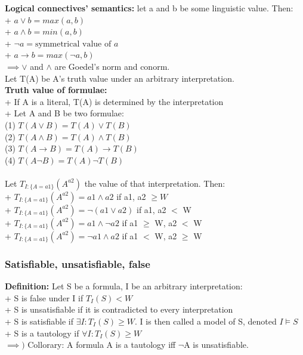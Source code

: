 \documentclass[26pt,fleqn,]{article}
\begin{document}
{\bfseries Logical connectives' semantics:} let a and b be some linguistic value. Then:\\
\indent + \(a \vee b = max(a,b)\)\\
\indent + \(a \wedge b = min(a,b)\)\\
\indent + \(\neg a = \text{symmetrical value of } a\)\\
\indent + \(a \to b = max(\neg a,b)\)\\
\(\implies \vee\) and \(\wedge\) are Goedel's norm and conorm.\\
Let T(A) be A's truth value under an arbitrary interpretation.\\
{\bfseries Truth value of formulae:}\\
\indent + If A is a literal, T(A) is determined by the interpretation\\
\indent + Let A and B be two formulae:\\
\indent \indent (1) \(T(A\vee B) = T(A) \vee T(B)\)\\
\indent \indent (2) \(T(A\wedge B) = T(A) \wedge T(B)\)\\
\indent \indent (3) \(T(A\to B) = T(A) \to T(B)\)\\
\indent \indent (4) \(T(A\neg B) = T(A) \neg T(B)\)
\\\\
Let \(T_{I:\{A = a1\}}(A^{a2})\) the value of that interpretation. Then:\\
\indent + \(T_{I:\{A = a1\}}(A^{a2}) = a1 \wedge a2 \) if a1, a2 \(\ge W\)\\
\indent + \(T_{I:\{A = a1\}}(A^{a2}) = \neg (a1 \vee a2) \) if a1, a2 \(<\) W\\
\indent + \(T_{I:\{A = a1\}}(A^{a2}) = a1 \wedge \neg a2 \) if a1 \(\ge\) W, a2 \(<\) W\\
\indent + \(T_{I:\{A = a1\}}(A^{a2}) = \neg a1 \wedge a2 \) if a1 \(<\) W, a2 \(\ge\) W\\

\subsubsection{Satisfiable, unsatisfiable, false}
{\bfseries Definition:} Let S be a formula, I be an arbitrary interpretation:\\
\indent + S is false under I if \(T_I(S) < W\)\\
\indent + S is unsatisfiable if it is contradicted to every interpretation\\ 
\indent + S is satisfiable if \(\exists I: T_I(S) \ge W\). I is then called a model of S, denoted \(I \models S\)\\
\indent + S is a tautology if \(\forall I: T_I(S) \ge W\)\\
\indent \(\implies)\) Collorary: A formula A is a tautology iff \(\neg\)A is unsatisfiable.
\end{document}
